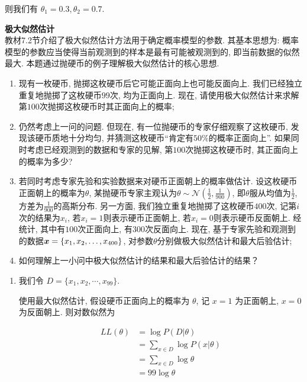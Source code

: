 \documentclass[answers]{exam}  %
\begin{document}
\begin{questions}
\begin{solution}
\begin{enumerate}
            则我们有 $\theta_1 = 0.3, \theta_2 = 0.7$.
    \end{enumerate}
  \end{solution}

  \question [20] \textbf{极大似然估计} \\
  教材7.2节介绍了极大似然估计方法用于确定概率模型的参数. 其基本思想为: 概率模型的参数应当使得当前观测到的样本是最有可能被观测到的, 即当前数据的似然最大. 本题通过抛硬币的例子理解极大似然估计的核心思想.
  \begin{enumerate}
    \item 现有一枚硬币, 抛掷这枚硬币后它可能正面向上也可能反面向上. 我们已经独立重复地抛掷了这枚硬币$99$次, 均为正面向上. 现在, 请使用极大似然估计来求解第$100$次抛掷这枚硬币时其正面向上的概率;
    \item 仍然考虑上一问的问题. 但现在, 有一位抛硬币的专家仔细观察了这枚硬币, 发现该硬币质地十分均匀, 并猜测这枚硬币“肯定有$50\%$的概率正面向上”. 如果同时考虑已经观测到的数据和专家的见解, 第$100$次抛掷这枚硬币时, 其正面向上的概率为多少?

    \item 若同时考虑专家先验和实验数据来对硬币正面朝上的概率做估计. 设这枚硬币正面朝上的概率为$\theta$, 某抛硬币专家主观认为$\theta\sim\mathcal{N}(\frac{1}{2}, \frac{1}{900})$, 即$\theta$服从均值为$\frac{1}{2}$, 方差为$\frac{1}{900}$的高斯分布. 另一方面, 我们独立重复地抛掷了这枚硬币$400$次, 记第$i$次的结果为$x_i$, 若$x_i=1$则表示硬币正面朝上, 若$x_i=0$则表示硬币反面朝上. 经统计, 其中有$100$次正面向上, 有$300$次反面向上. 现在, 基于专家先验和观测到的数据${\boldsymbol{x}}=\{x_1, x_2, \ldots, x_{400}\}$, 对参数$\theta$分别做极大似然估计和最大后验估计;

    \item 如何理解上一小问中极大似然估计的结果和最大后验估计的结果？
  \end{enumerate}

  \begin{solution}
    \begin{enumerate}
      \item

            我们令 $D = \{ x_1, x_2, \cdots, x_{99} \}$.

            使用最大似然估计, 假设硬币正面向上的概率为 $\theta$, 记 $x = 1$ 为正面朝上, $x = 0$ 为反面朝上. 则对数似然为

            $$
              \begin{aligned}
                LL(\theta) & = \log P(D | \theta)              \\
                           & = \sum_{x \in D} \log P(x|\theta) \\
                           & = \sum_{x \in D} \log \theta      \\
                           & = 99\log \theta
              \end{aligned}
            $$


\end{enumerate}
\end{solution}
\end{questions}
\end{document}
